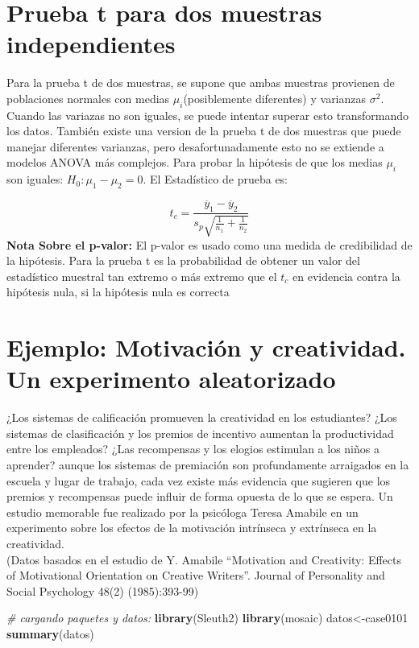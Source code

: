 \documentclass[]{book}
\newenvironment{Shaded}{\begin{snugshade}}{\end{snugshade}}
\newcommand{\KeywordTok}[1]{\textcolor[rgb]{0.13,0.29,0.53}{\textbf{#1}}}
\newcommand{\CommentTok}[1]{\textcolor[rgb]{0.56,0.35,0.01}{\textit{#1}}}
\newcommand{\NormalTok}[1]{#1}
\begin{document}
\section{Prueba t para dos muestras
independientes}\label{prueba-t-para-dos-muestras-independientes}

Para la prueba t de dos muestras, se supone que ambas muestras provienen
de poblaciones normales con medias \(\mu_i\)(posiblemente diferentes) y
varianzas \(\sigma^2\). Cuando las variazas no son iguales, se puede
intentar superar esto transformando los datos. También existe una
version de la prueba t de dos muestras que puede manejar diferentes
varianzas, pero desafortunadamente esto no se extiende a modelos ANOVA
más complejos. Para probar la hipótesis de que los medias \(\mu_i\) son
iguales: \(H_0:\mu_1 - \mu_2=0\). El Estadístico de prueba es:

\[t_c=\frac{\overline{y}_1-\overline{y}_2}{s_p\sqrt{\frac{1}{n_1}+\frac{1}{n_2}}}\]
\textbf{Nota Sobre el p-valor:} El p-valor es usado como una medida de
credibilidad de la hipótesis. Para la prueba t es la probabilidad de
obtener un valor del estadístico muestral tan extremo o más extremo que
el \(t_c\) en evidencia contra la hipótesis nula, si la hipótesis nula
es correcta

\section{Ejemplo: Motivación y creatividad. Un experimento
aleatorizado}\label{ejemplo-motivacion-y-creatividad.-un-experimento-aleatorizado}

¿Los sistemas de calificación promueven la creatividad en los
estudiantes? ¿Los sistemas de clasificación y los premios de incentivo
aumentan la productividad entre los empleados? ¿Las recompensas y los
elogios estimulan a los niños a aprender? aunque los sistemas de
premiación son profundamente arraigados en la escuela y lugar de
trabajo, cada vez existe más evidencia que sugieren que los premios y
recompensas puede influir de forma opuesta de lo que se espera. Un
estudio memorable fue realizado por la psicóloga Teresa Amabile en un
experimento sobre los efectos de la motivación intrínseca y extrínseca
en la creatividad.\\
(Datos basados en el estudio de Y. Amabile ``Motivation and Creativity:
Effects of Motivational Orientation on Creative Writers''. Journal of
Personality and Social Psychology 48(2) (1985):393-99)

\begin{Shaded}
\begin{Highlighting}[]
\CommentTok{# cargando paquetes y datos:}
\KeywordTok{library}\NormalTok{(Sleuth2)}
\KeywordTok{library}\NormalTok{(mosaic)}
\NormalTok{datos<-case0101}
\KeywordTok{summary}\NormalTok{(datos)}
\end{Highlighting}
\end{Shaded}
\end{document}
